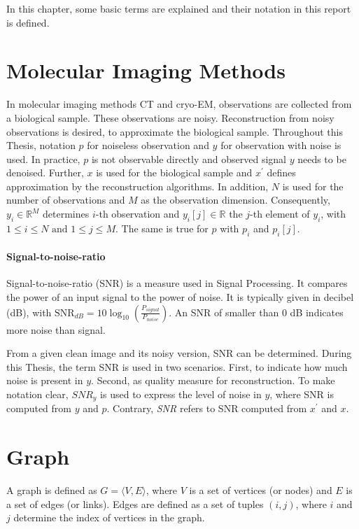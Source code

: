 In this chapter, some basic terms are explained and their notation in this report is defined.

\section{Molecular Imaging Methods}
In molecular imaging methods CT and cryo-EM, observations are collected from a biological sample. 
These observations are noisy. Reconstruction from noisy observations is desired, to approximate the biological sample.
Throughout this Thesis, notation $p$ for noiseless observation and $y$ for observation with noise is used.
In practice, $p$ is not observable directly and observed signal $y$ needs to be denoised.
Further, $x$ is used for the biological sample and $x^{\prime}$ defines approximation by the reconstruction algorithms.
In addition, $N$ is used for the number of observations and $M$ as the observation dimension.
Consequently, $y_i \in \mathbb{R}^M$ determines $i$-th observation and $y_i[j] \in \mathbb{R}$ the $j$-th element of $y_i$,
with $ 1 \leq i \leq N \text{ and } 1 \leq j \leq M$. The same is true for $p$ with $p_i$ and $p_i[j]$. 


\paragraph{Signal-to-noise-ratio}
Signal-to-noise-ratio (SNR) is a measure used in Signal Processing. 
It compares the power of an input signal to the power of noise. It is typically given in decibel (dB), with
$\text{SNR}_{dB} = 10 \log_{10} \left(  \frac{P_{signal}}{P_{noise}} \right)$.
An SNR of smaller than 0 dB indicates more noise than signal.

From a given clean image and its noisy version, SNR can be determined.
During this Thesis, the term SNR is used  in two scenarios.
First, to indicate how much noise is present in $y$. Second, as quality measure for reconstruction.
To make notation clear, $\textit{SNR}_y$ is used to express the level of noise in $y$, 
where SNR is computed from $y$ and $p$.
Contrary, \textit{SNR} refers to SNR computed from $x^{\prime}$ and $x$.

\section{Graph}
A graph is defined as $G = \langle V,E \rangle$, where $V$ is a set of 
vertices (or nodes) and $E$ is a set of edges (or links). 
Edges are defined as a set of tuples $(i, j)$, where $i$ and $j$ determine 
the index of vertices in the graph.


